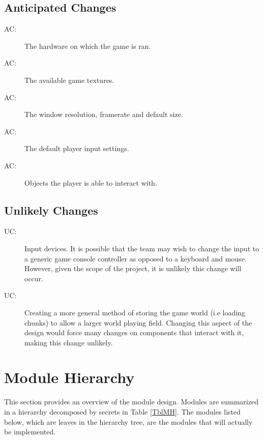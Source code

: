 \documentclass[12pt, titlepage]{article}
\newcounter{acnum}
\newcommand{\actheacnum}{AC\theacnum}
\newcounter{ucnum}
\newcommand{\uctheucnum}{UC\theucnum}
\begin{document}
\subsection{Anticipated Changes} \label{SecAchange}

\begin{description}
\item[ \actheacnum \label{acHardware}:] The hardware on which the game is ran.
\item[ \actheacnum \label{acTex}:] The available game textures.
\item[ \actheacnum \label{acPerf}:] The window resolution, framerate and default size.
\item[ \actheacnum \label{acSettings}:] The default player input settings.
\item[ \actheacnum \label{acObj}:] Objects the player is able to interact with.
\end{description}

\subsection{Unlikely Changes} \label{SecUchange}
\begin{description}
\item[ \uctheucnum \label{ucIO}:] Input devices. It is possible that the team may wish to change the input to a generic game console controller as opposed to a keyboard and mouse. However, given the scope of the project, it is unlikely this change will occur.
\item[ \uctheucnum \label{ucInput}:] Creating a more general method of storing the game world (i.e loading chunks) to allow a larger world playing field. Changing this aspect of the design would force many changes on components that interact with it, making this change unlikely.
\end{description}

\section{Module Hierarchy} \label{SecMH}

This section provides an overview of the module design. Modules are summarized
in a hierarchy decomposed by secrets in Table \ref{TblMH}. The modules listed
below, which are leaves in the hierarchy tree, are the modules that will
actually be implemented.
\end{document}
